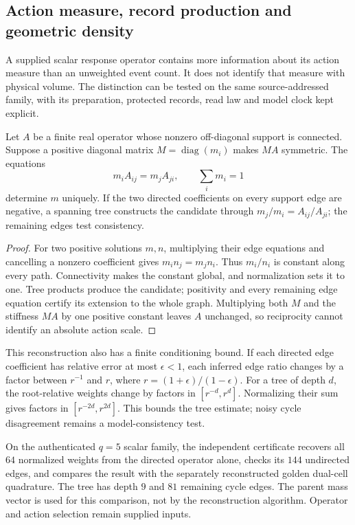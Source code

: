 \subsection{Action measure, record production and geometric density}
\label{sec:source-action-density-identification}

A supplied scalar response operator contains more information about its
action measure than an unweighted event count. It does not identify
that measure with physical volume. The distinction can be tested on the
same source-addressed family, with its preparation, protected records,
read law and model clock kept explicit.

\begin{proposition}
\label{prop:source-action-measure-identification}
Let $A$ be a finite real operator whose nonzero off-diagonal support is
connected. Suppose a positive diagonal matrix $M=\operatorname{diag}(m_i)$
makes $MA$ symmetric. The equations
\[
 m_iA_{ij}=m_jA_{ji},\qquad \sum_i m_i=1
\]
determine $m$ uniquely. If the two directed coefficients on every support
edge are negative, a spanning tree constructs the candidate through
$m_j/m_i=A_{ij}/A_{ji}$; the remaining edges test consistency.
\end{proposition}
\begin{proof}
For two positive solutions $m,n$, multiplying their edge equations and
cancelling a nonzero coefficient gives $m_i n_j=m_j n_i$. Thus $m_i/n_i$
is constant along every path. Connectivity makes the constant global,
and normalization sets it to one. Tree products produce the candidate;
positivity and every remaining edge equation certify its extension to
the whole graph. Multiplying both $M$ and the stiffness $MA$ by one
positive constant leaves $A$ unchanged, so reciprocity cannot identify
an absolute action scale.
\end{proof}

This reconstruction also has a finite conditioning bound. If each
directed edge coefficient has relative error at most $\epsilon<1$,
each inferred edge ratio changes by a factor between $r^{-1}$ and $r$,
where $r=(1+\epsilon)/(1-\epsilon)$. For a tree of depth $d$, the
root-relative weights change by factors in $[r^{-d},r^d]$. Normalizing
their sum gives factors in $[r^{-2d},r^{2d}]$. This bounds the tree
estimate; noisy cycle disagreement remains a model-consistency test.

On the authenticated $q=5$ scalar family, the independent certificate
recovers all $64$ normalized weights from the directed operator alone,
checks its $144$ undirected edges, and compares the result with the
separately reconstructed golden dual-cell quadrature. The tree has depth
$9$ and $81$ remaining cycle edges. The parent mass vector is used for
this comparison, not by the reconstruction algorithm. Operator and
action selection remain supplied inputs.

